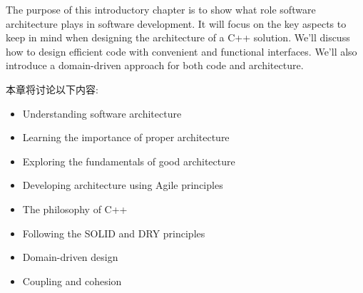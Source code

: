 The purpose of this introductory chapter is to show what role software architecture plays in software development. It will focus on the key aspects to keep in mind when designing the architecture of a C++ solution. We'll discuss how to design efficient code with convenient and functional interfaces. We'll also introduce a domain-driven approach for both code and architecture.


本章将讨论以下内容:

\begin{itemize}
\item Understanding software architecture
\item Learning the importance of proper architecture
\item Exploring the fundamentals of good architecture
\item Developing architecture using Agile principles
\item The philosophy of C++
\item Following the SOLID and DRY principles
\item Domain-driven design
\item Coupling and cohesion
\end{itemize}